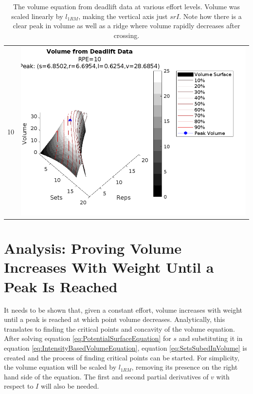 \begin{table}[]
\begin{tabular}{c|c}
        10 &
        \includegraphics[width=139mm]{DeadliftVolume/10-1.png} \\%
    \end{tabular}
    \caption{The volume equation from deadlift data at various effort levels. Volume was scaled linearly by $l_{1RM}$, making the vertical axis just $srI$. Note how there is a clear peak in volume as well as a ridge where volume rapidly decreases after crossing.}
    \label{tab:DeadliftVolumeAcrossEffort}
\end{table}


\section{Analysis: Proving Volume Increases With Weight Until a Peak Is Reached}
\label{sec:PotentialSurfaceVolumePeak}

It needs to be shown that, given a constant effort, volume increases with weight until a peak is reached at which point volume decreases. Analytically, this translates to finding the critical points and concavity of the volume equation. After solving equation \ref{eq:PotentialSurfaceEquation} for $s$ and substituting it in equation \ref{eq:IntensityBasedVolumeEquation}, equation \ref{eq:SetsSubedInVolume} is created and the process of finding critical points can be started. For simplicity, the volume equation will be scaled by $l_{1RM}$, removing its presence on the right hand side of the equation. The first and second partial derivatives of $v$ with respect to $I$ will also be needed.

